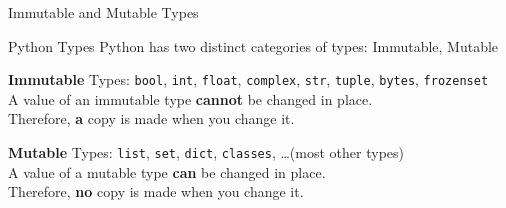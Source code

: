 \documentclass[10pt, colorlinks=true, urlcolor=blue]{beamer}
\begin{document}
\begin{frame}{Immutable and Mutable Types}
  \begin{block}{Python Types}
    Python has two distinct categories of types: Immutable, Mutable
  \end{block}
  
  \vspace{2em}
  
  \textbf{Immutable} Types: \texttt{bool}, \texttt{int}, \texttt{float}, \texttt{complex}, \texttt{str}, \texttt{tuple}, \texttt{bytes}, \texttt{frozenset} \\
  
  \vspace{-0.8em}
  A value of an immutable type \textbf{cannot} be changed in place. \\
  Therefore, \textbf{a} copy is made when you change it. \\
  
  \vspace{2.0em}
  
  \textbf{Mutable} Types: \texttt{list}, \texttt{set}, \texttt{dict}, \texttt{classes}, \dots (most other types) \\
  
  \vspace{-0.8em}
  A value of a mutable type \textbf{can} be changed in place. \\
  Therefore, \textbf{no} copy is made when you change it.
\end{frame}
\end{document}
